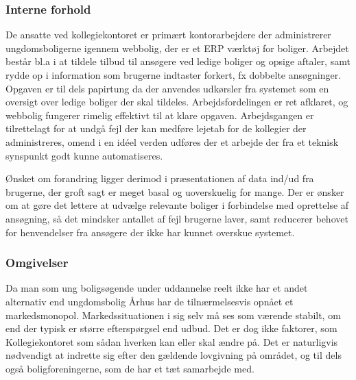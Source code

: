 \documentclass[12pt, a4paper]{report}
\begin{document}
\begin{itemize}
   \subsubsection{Interne forhold}
De ansatte ved kollegiekontoret er primært kontorarbejdere der administrerer ungdomsboligerne igennem webbolig, der er et ERP værktøj for boliger. Arbejdet består bl.a i at tildele tilbud til ansøgere ved ledige boliger og opsige aftaler, samt rydde op i information som brugerne indtaster forkert, fx dobbelte ansøgninger. Opgaven er til dels papirtung da der anvendes udkørsler fra systemet som en oversigt over ledige boliger der skal tildeles. Arbejdsfordelingen er ret afklaret, og webbolig fungerer rimelig effektivt til at klare opgaven. Arbejdsgangen er tilrettelagt for at undgå fejl der kan medføre lejetab for de kollegier der administreres, omend i en idéel verden udføres der et arbejde der fra et teknisk synspunkt godt kunne automatiseres.

Ønsket om forandring ligger derimod i præsentationen af data ind/ud fra brugerne, der groft sagt er meget basal og uoverskuelig for mange. Der er ønsker om at gøre det lettere at udvælge relevante boliger i forbindelse med oprettelse af ansøgning, så det mindsker antallet af fejl brugerne laver, samt reducerer behovet for henvendelser fra ansøgere der ikke har kunnet overskue systemet.
   \subsubsection{Omgivelser}
Da man som ung boligsøgende under uddannelse reelt ikke har et andet alternativ end ungdomsbolig Århus har de tilnærmelsesvis opnået et markedsmonopol. Markedssituationen i sig selv må ses som værende stabilt, om end der typisk er større efterspørgsel end udbud. Det er dog ikke faktorer, som Kollegiekontoret som sådan hverken kan eller skal ændre på. Det er naturligvis nødvendigt at indrette sig efter den gældende lovgivning på området, og til dels også boligforeningerne, som de har et tæt samarbejde med.


\end{itemize}
\end{document}
